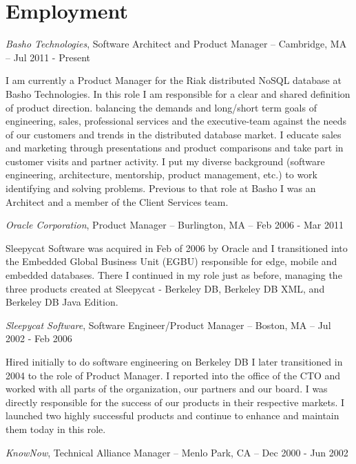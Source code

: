 \documentclass[letterpaper]{article}
\renewenvironment{itemize}{
  \begin{list}{}{
    \setlength{\leftmargin}{1.5em}
  }
}{
  \end{list}
}
\begin{document}
\section*{Employment}

\begin{itemize}
\item {\it Basho Technologies}, Software Architect and Product Manager -- Cambridge, MA -- Jul 2011 - Present

I am currently a Product Manager for the Riak distributed NoSQL database at
Basho Technologies. In this role I am responsible for a clear and shared
definition of product direction.
balancing the demands and
long/short term goals of engineering, sales, professional services and the
executive-team against the needs of our customers and trends in the distributed
database market. I educate sales and marketing through presentations and
product comparisons and take part in customer visits and partner activity. I
put my diverse background (software engineering, architecture, mentorship,
product management, etc.) to work identifying and solving problems. Previous to
that role at Basho I was an Architect and a member of the Client Services team.

\item {\it Oracle Corporation}, Product Manager -- Burlington, MA -- Feb 2006 - Mar 2011

Sleepycat Software was acquired in Feb of 2006 by Oracle and I transitioned
into the Embedded Global Business Unit (EGBU) responsible for edge, mobile and
embedded databases. There I continued in my role just as before, managing the
three products created at Sleepycat - Berkeley DB, Berkeley DB XML, and
Berkeley DB Java Edition.

\item {\it Sleepycat Software}, Software Engineer/Product Manager -- Boston, MA -- Jul 2002 - Feb 2006

Hired initially to do software engineering on Berkeley DB I later transitioned
in 2004 to the role of Product Manager. I reported into the office of the CTO
and worked with all parts of the organization, our partners and our board. I
was directly responsible for the success of our products in their respective
markets. I launched two highly successful products and continue to enhance and
maintain them today in this role.

\item {\it KnowNow}, Technical Alliance Manager -- Menlo Park, CA -- Dec 2000 - Jun 2002


\end{itemize}
\end{document}
